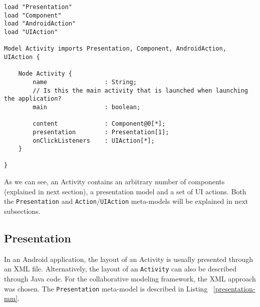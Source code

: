 \begin{lstlisting}[label=activity-mm,caption=Activity meta-model, captionpos=t]
load "Presentation"
load "Component"
load "AndroidAction"
load "UIAction"

Model Activity imports Presentation, Component, AndroidAction, UIAction {

	Node Activity {
		name				: String;
		// Is this the main activity that is launched when launching the application?
		main 				: boolean;

		content				: Component@0[*];
		presentation		: Presentation[1];
		onClickListeners 	: UIAction[*];
	}

}
\end{lstlisting}
As we can see, an Activity contains an arbitrary number of components (explained in next section), a presentation model and a set of UI actions. Both the \texttt{Presentation} and \texttt{Action}/\texttt{UIAction} meta-models will be explained in next subsections.

\subsection{Presentation}

In an Android application, the layout of an Activity is usually presented through an XML file. Alternatively, the layout of an \texttt{Activity} can also be described through Java code. For the collaborative modeling framework, the XML approach was chosen. The \texttt{Presentation} meta-model is described in Listing ~\ref{presentation-mm}.


